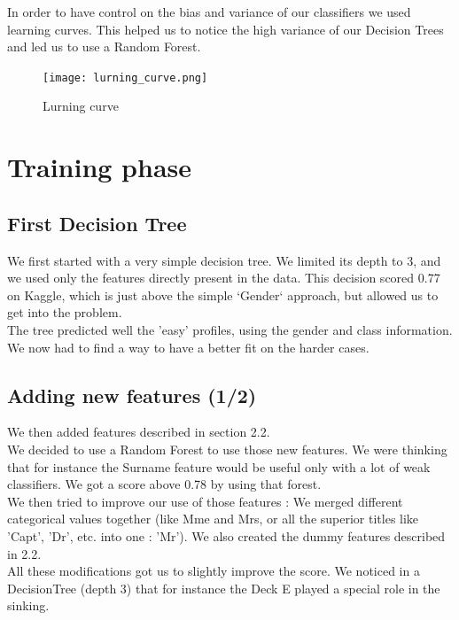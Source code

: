\documentclass[a4paper,10pt]{article}
\begin{document}
In order to have control on the bias and variance of our classifiers we used learning curves. This helped us to notice the high variance of our Decision Trees and led us to use a Random Forest.

\begin{figure}[h!]
  \centering
    
      \texttt{[image: lurning\_curve.png]}
  \caption{Lurning curve}
\end{figure}


\section{Training phase}
\subsection{First Decision Tree}

We first started with a very simple decision tree. We limited its depth to 3, and we used only the features directly present
in the data. This decision scored 0.77 on Kaggle, which is just above the simple `Gender` approach, but allowed us to 
get into the problem. \\

The tree predicted well the 'easy' profiles, using the gender and class information. We now had to find a way to have a better fit on the harder cases.

\subsection{Adding new features (1/2)}

We then added features described in section 2.2.\\

We decided to use a Random Forest to use those new features. We were thinking that for instance the Surname feature would be useful only with a lot of weak classifiers. We got a score above 0.78 by using that forest. \\

We then tried to improve our use of those features : We merged different categorical values together (like Mme and Mrs, or 
all the superior titles like 'Capt', 'Dr', etc. into one : 'Mr'). We also created the dummy features described in 2.2.\\

All these modifications got us to slightly improve the score. We noticed in a DecisionTree (depth 3) that for instance the Deck E 
played a special role in the sinking.\\
\end{document}
